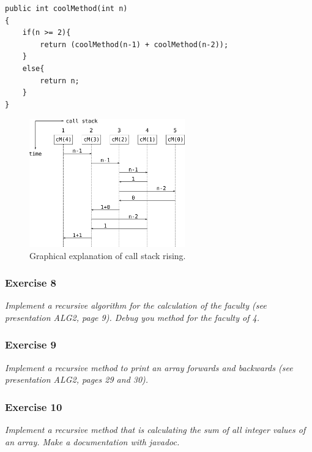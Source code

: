 \begin{lstlisting}
public int coolMethod(int n)
{
	if(n >= 2){
		return (coolMethod(n-1) + coolMethod(n-2));
	} 
	else{
		return n;
	}
}
\end{lstlisting}

\begin{figure}[h!]
	\centering
	\includegraphics[width=0.6\textwidth]{callstack.pdf}
	\caption{Graphical explanation of call stack rising.}
	\label{pic:callstack}
\end{figure}

\subsubsection*{Exercise 8}
\textit{Implement a recursive algorithm for the calculation of the
faculty (see presentation ALG2, page 9). Debug you method for the
faculty of 4.} \\



\subsubsection*{Exercise 9}
\textit{Implement a recursive method to print an array forwards and
 backwards (see presentation ALG2, pages 29 and 30).} \\



\subsubsection*{Exercise 10}
\textit{Implement a recursive method that is calculating the sum of
all integer values of an array. Make a documentation with javadoc.} \\

